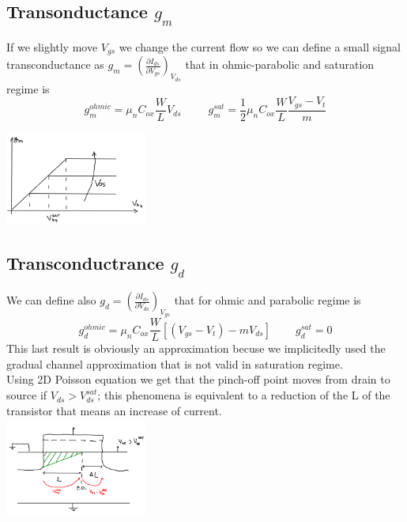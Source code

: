 \subsection{Transonductance $g_m$}
If we slightly move $V_{gs}$ we change the current flow so we can define a small signal transconductance as $g_m=\left(\frac{\partial I_{ds}}{\partial V_{gs}}\right)_{V_{ds}}$ that in ohmic-parabolic and saturation regime is
\begin{equation}
g_m^{ohmic}=\mu_nC_{ox}\frac{W}{L}V_{ds} \ \ \ \ \ \ \ \ \ \ \  g_m^{sat}=\frac{1}{2}\mu_nC_{ox}\frac{W}{L}\frac{V_{gs}-V_t}{m}
\end{equation} 

\centering
\includegraphics[width=0.35\textwidth]{gmmos.png}\\
\raggedright

\subsection{Transconductrance $g_d$}
We can define also $g_d=\left(\frac{\partial I_{ds}}{\partial V_{ds}}\right)_{V_{gs}}$ that for ohmic and parabolic regime is
\begin{equation}
g_d^{ohmic}=\mu_nC_{ox}\frac{W}{L}[(V_{gs}-V_t)-mV_{ds}] \ \ \ \ \ \ \ \ \ \ g_d^{sat}=0
\end{equation}
This last result is obviously an approximation becuse we implicitedly used the gradual channel approximation that is not valid in saturation regime.\\
Using 2D Poisson equation we get that the pinch-off point moves from drain to source if $V_{ds}>V_{ds}^{sat}$; this phenomena is equivalent to a reduction of the L of the transistor that means an increase of current.\\

\centering
\includegraphics[width=0.35\textwidth]{early.png}\\
\raggedright

